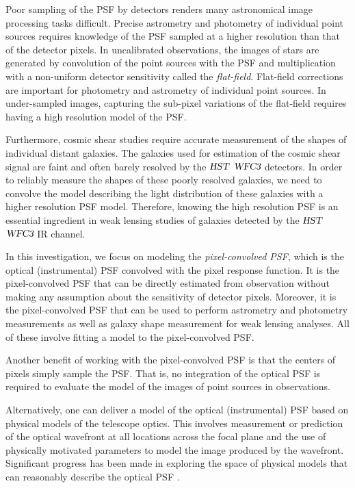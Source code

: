 Poor sampling of the PSF by detectors renders many astronomical image processing tasks difficult. Precise astrometry and photometry 
of individual point sources requires knowledge of the PSF sampled at a higher resolution than that of the detector pixels. 
In uncalibrated observations, the images of stars are generated by convolution of the point sources with the PSF and multiplication 
with a non-uniform detector sensitivity called the \emph{flat-field}. Flat-field corrections are important for photometry and astrometry of 
individual point sources. In under-sampled images, capturing the sub-pixel variations of the flat-field requires having a high resolution 
model of the PSF. 

Furthermore, cosmic shear studies require accurate measurement of the shapes of individual distant galaxies. The galaxies used for estimation 
of the cosmic shear signal are faint and often barely resolved by the ${\textsl{HST}}$ ${\textsl{WFC3}}$ detectors. In order to reliably measure the shapes of these poorly 
resolved galaxies, we need to convolve the model describing the light distribution of these galaxies with a higher resolution PSF model. 
Therefore, knowing the high resolution PSF is an essential ingredient in weak lensing studies of galaxies detected by the ${\textsl{HST}}$ ${\textsl{WFC3}}$ IR 
channel.   

In this investigation, we focus on modeling the \emph{pixel-convolved PSF}, which is the optical (instrumental) PSF convolved with the 
pixel response function. It is the pixel-convolved PSF that can be directly estimated from observation without making any assumption 
about the sensitivity of detector pixels. Moreover, it is the pixel-convolved PSF that can be used to perform astrometry and photometry measurements as well as 
galaxy shape measurement for weak lensing analyses. All of these involve fitting a model to the pixel-convolved PSF. 

Another benefit of working with the pixel-convolved PSF is that the centers of pixels simply sample the PSF. That is, no integration of the 
optical PSF is required to evaluate the model of the images of point sources in observations.

Alternatively, one can deliver a model of the optical (instrumental) PSF based on physical models of the telescope optics. 
This involves measurement or prediction of the optical wavefront at all locations across the focal plane and the use of physically motivated parameters 
to model the image produced by the wavefront. Significant progress has been made in exploring the space of physical models that can reasonably 
describe the optical PSF \citep{zernike,krist1995,krist2011,galsim_software}. 

